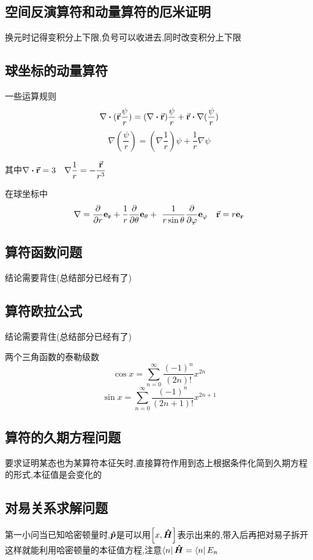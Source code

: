         \subsection{空间反演算符和动量算符的厄米证明}
            换元时记得变积分上下限,负号可以收进去,同时改变积分上下限
        \subsection{球坐标的动量算符}
            一些运算规则
            $$ \nabla \vdot (\va{r} \frac{\psi}{r})  =  (\nabla \vdot \va{r}) \frac{\psi}{r} + \va{r} \vdot \nabla(\frac{\psi}{r}) $$
            $$ \nabla (\frac{\psi}{r}) = (\nabla \frac{1}{r})\psi + \frac{1}{r} \nabla \psi $$
            
            其中$ \nabla \vdot \va{r} = 3 \quad \nabla \dfrac{1}{r} = - \dfrac{\va{r}}{r^{3}} $

            在球坐标中
            $$ \nabla =  \pdv{r} \vb{e_{r}} +  \frac{1}{r} \pdv{\theta} \vb{e_{\theta}} + \ \frac{1}{r \sin{\theta}} \pdv{\varphi} \vb{e_{\varphi}} \quad \va{r} = r \vb{e_{r}}  $$         
    
        \subsection{算符函数问题}
            结论需要背住(总结部分已经有了)
        \subsection{算符欧拉公式}
            结论需要背住(总结部分已经有了)
            \begin{formal}
                两个三角函数的泰勒级数
                $$ \cos{x} = \sum_{n=0}^{\infty} \frac{(-1)^{n}}{(2n)!} x^{2n} $$
                $$ \sin{x} = \sum_{n=0}^{\infty} \frac{(-1)^{n}}{(2n+1)!} x^{2n+1} $$
            \end{formal}
            
        
        \subsection{算符的久期方程问题}
            要求证明某态也为某算符本征矢时,直接算符作用到态上根据条件化简到久期方程的形式,本征值是会变化的
        \subsection{对易关系求解问题}
            第一小问当已知哈密顿量时,$\vu*{p}$是可以用$\comm{x}{\vu*{H}}$表示出来的,带入后再把对易子拆开这样就能利用哈密顿量的本征值方程,注意$ \bra{n} \vu*{H} = \bra{n} E_{n} $

